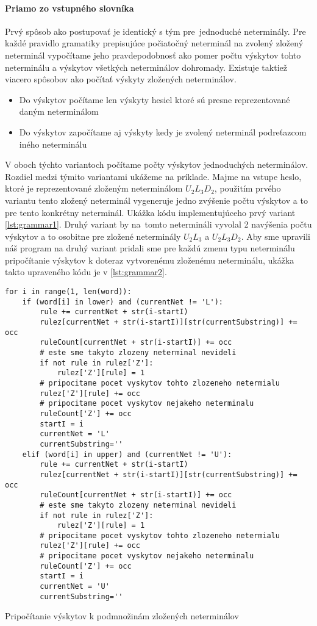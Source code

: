 \paragraph{Priamo zo vstupného slovníka}
Prvý spôsob ako postupovať je identický s tým pre~jednoduché neterminály. Pre každé pravidlo gramatiky prepisujúce počiatočný neterminál na zvolený zložený neterminál vypočítame jeho pravdepodobnosť ako pomer počtu výskytov tohto neterminálu a výskytov všetkých neterminálov dohromady. Existuje taktiež viacero spôsobov ako počítať výskyty zložených neterminálov.
\begin{itemize}
	\item Do výskytov počítame len výskyty hesiel ktoré sú presne reprezentované daným neterminálom
	\item Do výskytov započítame aj výskyty kedy je zvolený neterminál podreťazcom iného neterminálu
\end{itemize}
V oboch týchto variantoch počítame počty výskytov jednoduchých neterminálov. Rozdiel medzi týmito variantami ukážeme na príklade. Majme na vstupe heslo, ktoré je reprezentované zloženým neterminálom \(U_2L_3D_2\), použitím prvého variantu tento zložený neterminál vygeneruje jedno zvýšenie počtu výskytov a to pre tento konkrétny neterminál. Ukážka kódu implementujúceho prvý variant \ref{lst:grammar1}. Druhý variant by na~tomto netermináli vyvolal 2 navýšenia počtu výskytov a to osobitne pre zložené neterminály \(U_2L_3\) a \(U_2L_3D_2\). Aby sme upravili náš program na druhý variant pridali sme pre každú zmenu typu neterminálu pripočítanie výskytov k doteraz vytvorenému zloženému neterminálu, ukážka takto upraveného kódu je v \ref{lst:grammar2}.

\begin{listing}
\begin{verbatim}
for i in range(1, len(word)):
	if (word[i] in lower) and (currentNet != 'L'):
		rule += currentNet + str(i-startI)
		rulez[currentNet + str(i-startI)][str(currentSubstring)] += occ
		ruleCount[currentNet + str(i-startI)] += occ
		# este sme takyto zlozeny neterminal nevideli
		if not rule in rulez['Z']:
			rulez['Z'][rule] = 1
		# pripocitame pocet vyskytov tohto zlozeneho netermialu
		rulez['Z'][rule] += occ
		# pripocitame pocet vyskytov nejakeho neterminalu
		ruleCount['Z'] += occ
		startI = i
		currentNet = 'L'
		currentSubstring=''
	elif (word[i] in upper) and (currentNet != 'U'):
		rule += currentNet + str(i-startI)
		rulez[currentNet + str(i-startI)][str(currentSubstring)] += occ
		ruleCount[currentNet + str(i-startI)] += occ
		# este sme takyto zlozeny neterminal nevideli
		if not rule in rulez['Z']:
			rulez['Z'][rule] = 1
		# pripocitame pocet vyskytov tohto zlozeneho netermialu
		rulez['Z'][rule] += occ
		# pripocitame pocet vyskytov nejakeho neterminalu
		ruleCount['Z'] += occ
		startI = i
		currentNet = 'U'
		currentSubstring=''
\end{verbatim}
\caption{Pripočítanie výskytov k podmnožinám zložených neterminálov}
\label{lst:grammar2}
\end{listing}

